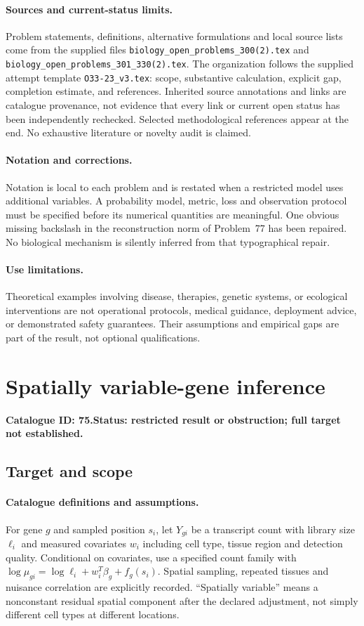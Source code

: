 \documentclass[11pt]{article}
\begin{document}
\paragraph{Sources and current-status limits.}
Problem statements, definitions, alternative formulations and local source lists
come from the supplied files
\texttt{biology\_open\_problems\_300(2).tex} and
\texttt{biology\_open\_problems\_301\_330(2).tex}.
The organization follows the supplied attempt template
\texttt{O33-23\_v3.tex}: scope, substantive calculation, explicit gap,
completion estimate, and references. Inherited source annotations and links are
catalogue provenance, not evidence that every link or current open status has
been independently rechecked. Selected methodological references appear at the
end. No exhaustive literature or novelty audit is claimed.

\paragraph{Notation and corrections.}
Notation is local to each problem and is restated when a restricted model uses
additional variables. A probability model, metric, loss and observation protocol
must be specified before its numerical quantities are meaningful. One obvious
missing backslash in the reconstruction norm of Problem~77 has been repaired.
No biological mechanism is silently inferred from that typographical repair.

\paragraph{Use limitations.}
Theoretical examples involving disease, therapies, genetic systems, or ecological
interventions are not operational protocols, medical guidance, deployment advice,
or demonstrated safety guarantees. Their assumptions and empirical gaps are part
of the result, not optional qualifications.

\setcounter{section}{74}
\section{Spatially variable-gene inference}
\label{prob:075}
\noindent\textbf{Catalogue ID: 75.}\quad \textbf{Status: restricted result or obstruction; full target not established.}
\subsection{Target and scope}
\paragraph{Catalogue definitions and assumptions.}
For gene $g$ and sampled position $s_i$, let $Y_{gi}$ be a transcript count with library size $\ell_i$ and measured covariates $w_i$ including cell type, tissue region and detection quality. Conditional on covariates, use a specified count family with $\log\mu_{gi}=\log\ell_i+w_i^T\beta_g+f_g(s_i)$. Spatial sampling, repeated tissues and nuisance correlation are explicitly recorded. ``Spatially variable'' means a nonconstant residual spatial component after the declared adjustment, not simply different cell types at different locations.
\end{document}
